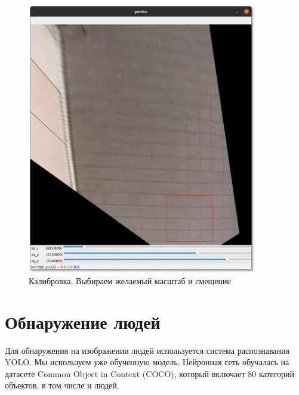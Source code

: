 \begin{figure}[H]
    \centering
    \includegraphics[width=10cm]{images/calibration2.png}
    \caption{Калибровка. Выбираем желаемый масштаб и смещение}
    \label{<label>}
\end{figure}


\section{Обнаружение людей}

Для обнаружения на изображении людей используется система распознавания YOLO. Мы используем уже обученную модель. Нейронная сеть обучалась на датасете Common Object in Context (COCO), который включает 80 категорий объектов, в том числе и людей.



